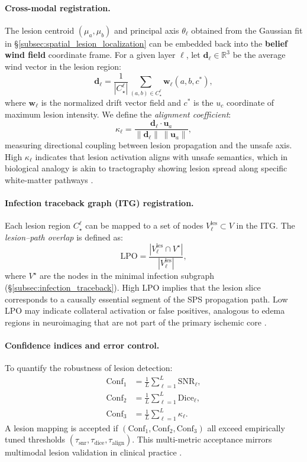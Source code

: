 \documentclass[11pt]{article}
\begin{document}
\paragraph{Cross-modal registration.}
The lesion centroid $(\mu_a,\mu_b)$ and principal axis $\theta_\ell$ obtained from the Gaussian fit in \S\ref{subsec:spatial_lesion_localization} can be embedded back into the \textbf{belief wind field} coordinate frame.  
For a given layer $\ell$, let $\mathbf{d}_\ell \in \mathbb{R}^3$ be the average wind vector in the lesion region:
\[
\mathbf{d}_\ell = \frac{1}{|C_\star^\ell|} \sum_{(a,b) \in C_\star^\ell} \mathbf{w}_\ell(a,b,c^\ast),
\]
where $\mathbf{w}_\ell$ is the normalized drift vector field and $c^\ast$ is the $u_c$ coordinate of maximum lesion intensity.  
We define the \emph{alignment coefficient}:
\[
\kappa_\ell = \frac{\mathbf{d}_\ell \cdot \mathbf{u}_a}{\|\mathbf{d}_\ell\|\,\|\mathbf{u}_a\|},
\]
measuring directional coupling between lesion propagation and the unsafe axis.  
High $\kappa_\ell$ indicates that lesion activation aligns with unsafe semantics, which in biological analogy is akin to tractography showing lesion spread along specific white-matter pathways \citep{catani2008tractography}.

\paragraph{Infection traceback graph (ITG) registration.}
Each lesion region $C_\star^\ell$ can be mapped to a set of nodes $V_\ell^{\mathrm{les}} \subset V$ in the ITG.  
The \emph{lesion–path overlap} is defined as:
\[
\mathrm{LPO} = \frac{|V_\ell^{\mathrm{les}} \cap V^\star|}{|V_\ell^{\mathrm{les}}|},
\]
where $V^\star$ are the nodes in the minimal infection subgraph (\S\ref{subsec:infection_traceback}).  
High LPO implies that the lesion slice corresponds to a causally essential segment of the SPS propagation path.  
Low LPO may indicate collateral activation or false positives, analogous to edema regions in neuroimaging that are not part of the primary ischemic core \citep{heiss2012ischemic}.

\paragraph{Confidence indices and error control.}
To quantify the robustness of lesion detection:
\begin{align*}
\mathrm{Conf}_1 &= \frac{1}{L} \sum_{\ell=1}^L \mathrm{SNR}_\ell, \\
\mathrm{Conf}_2 &= \frac{1}{L} \sum_{\ell=1}^L \mathrm{Dice}_\ell, \\
\mathrm{Conf}_3 &= \frac{1}{L} \sum_{\ell=1}^L \kappa_\ell.
\end{align*}
A lesion mapping is accepted if $(\mathrm{Conf}_1, \mathrm{Conf}_2, \mathrm{Conf}_3)$ all exceed empirically tuned thresholds $(\tau_{\mathrm{snr}},\tau_{\mathrm{dice}},\tau_{\mathrm{align}})$.  
This multi-metric acceptance mirrors multimodal lesion validation in clinical practice \citep{tustison2014advanced}.
\end{document}
